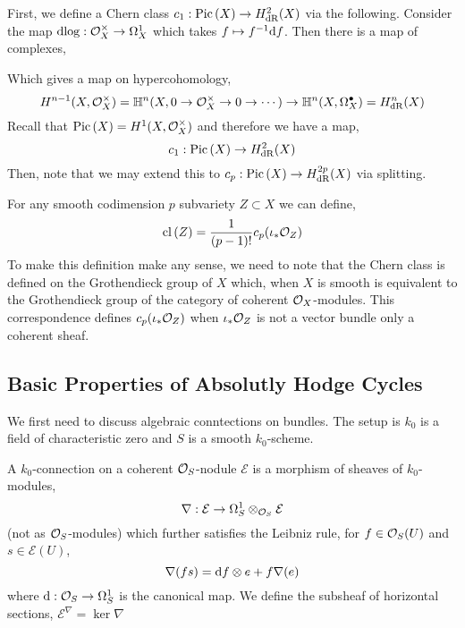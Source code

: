 \documentclass[12pt]{article}
\begin{document}
\begin{definition}
First, we define a Chern class $c_1 : \mathrm{Pic} \left( X \right) \to H^2_{\mathrm{dR}}(X)$ via the following. Consider the map $\mathrm{d}{\log} : \mathcal{O}_{X}^\times \to \Omega^1_X$ which takes $f \mapsto f^{-1} \mathrm{d}{f}$. Then there is a map of complexes,
\begin{center}
\end{center}
Which gives a map on hypercohomology,
\[ H^{n-1}(X, \mathcal{O}_{X}^\times) = \mathbb{H}^n(X, 0 \to \mathcal{O}_{X}^\times \to 0 \to \cdots) \to \mathbb{H}^n(X, \Omega^\bullet_X) = H^n_{\mathrm{dR}}(X) \]
Recall that $\mathrm{Pic} \left( X \right) = H^1(X, \mathcal{O}_{X}^\times)$ and therefore we have a map,
\[ c_1 : \mathrm{Pic} \left( X \right) \to H^2_{\mathrm{dR}}(X) \]
Then, note that we may extend this to $c_p : \mathrm{Pic} \left( X \right) \to H^{2p}_{\mathrm{dR}}(X)$ via splitting.
\end{definition}

\begin{definition}
For any smooth codimension $p$ subvariety $Z \subset X$ we can define,
\[ \mathrm{cl} \left( Z \right) = \frac{1}{(p - 1)!} c_p(\iota_* \mathcal{O}_{Z}) \]
To make this definition make any sense, we need to note that the Chern class is defined on the Grothendieck group of $X$ which, when $X$ is smooth is equivalent to the Grothendieck group of the category of coherent $\mathcal{O}_{X}$-modules. This correspondence defines $c_p(\iota_* \mathcal{O}_{Z})$ when $\iota_* \mathcal{O}_{Z}$ is not a vector bundle only a coherent sheaf. 
\end{definition}

\subsection{Basic Properties of Absolutly Hodge Cycles}

\newcommand{\E}{\mathcal{E}}

\begin{remark}
We first need to discuss algebraic conntections on bundles. The setup is $k_0$ is a field of characteristic zero and $S$ is a smooth $k_0$-scheme.  
\end{remark}

\begin{definition}
A $k_0$-connection on a coherent $\mathcal{O}_{S}$-nodule $\mathcal{E}$ is a morphism of sheaves of $k_0$-modules,
\[ \nabla : \mathcal{E} \to \Omega^1_{S} \otimes_{\mathcal{O}_{S}} \mathcal{E} \]
(not as $\mathcal{O}_{S}$-modules) which further satisfies the Leibniz rule, for $f \in \mathcal{O}_{S}(U)$ and $s \in \mathcal{E}(U)$,
\[ \nabla (f s) = \mathrm{d}{f} \otimes e + f \nabla (e) \]
where $\mathrm{d}{} : \mathcal{O}_{S} \to \Omega^1_S$ is the canonical map. We define the subsheaf of horizontal sections, $\mathcal{E}^\nabla = \ker{\nabla}$
\end{definition}
\end{document}
